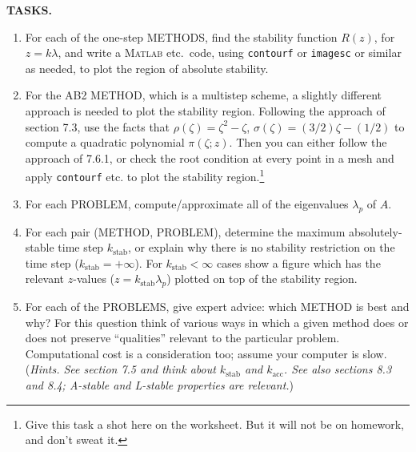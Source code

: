 \documentclass[11pt]{amsart}
\newcommand{\Matlab}{\textsc{Matlab}\xspace}
\newcommand{\kstab}{k_{\text{stab}}}
\begin{document}
\bigskip
\noindent \textbf{TASKS.}
\renewcommand{\labelenumi}{\textbf{(\alph{enumi})}\,}
\begin{enumerate}
\item For each of the one-step METHODS, find the stability function $R(z)$, for $z=k\lambda$, and write a \Matlab etc.~code, using \texttt{contourf} or \texttt{imagesc} or similar as needed, to plot the region of absolute stability.
\item For the AB2 METHOD, which is a multistep scheme, a slightly different approach is needed to plot the stability region.  Following the approach of section 7.3, use the facts that $\rho(\zeta) = \zeta^2 - \zeta$, $\sigma(\zeta) = (3/2) \zeta - (1/2)$ to compute a quadratic polynomial $\pi(\zeta; z)$.  Then you can either follow the approach of 7.6.1, or check the root condition at every point in a mesh and apply \texttt{contourf} etc. to plot the stability region.\footnote{Give this task a shot here on the worksheet.  But it will not be on homework, and don't sweat it.}
\item For each PROBLEM, compute/approximate all of the eigenvalues $\lambda_p$ of $A$.
\item For each pair (METHOD, PROBLEM), determine the maximum absolutely-stable time step $\kstab$, or explain why there is no stability restriction on the time step ($\kstab=+\infty$).  For $\kstab<\infty$ cases show a figure which has the relevant $z$-values ($z=\kstab \lambda_p$) plotted on top of the stability region.
\item For each of the PROBLEMS, give expert advice: which METHOD is best and why?  For this question think of various ways in which a given method does or does not preserve ``qualities'' relevant to the particular problem.  Computational cost is a consideration too; assume your computer is slow.  (\emph{Hints. See section 7.5 and think about $\kstab$ and $k_{\text{acc}}$.  See also sections 8.3 and 8.4; A-stable and L-stable properties are relevant.})
\end{enumerate}

\vfill
\end{document}

